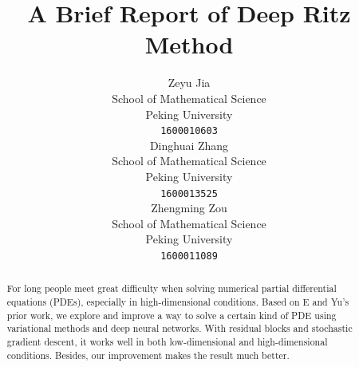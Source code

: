 \documentclass{article}
\title{A Brief Report of Deep Ritz Method}
\author{
  Zeyu Jia\\School of Mathematical Science\\Peking University\\ \texttt{1600010603} \\
  \And
  Dinghuai Zhang\\School of Mathematical Science\\Peking University\\ \texttt{1600013525}\\
  \And
  Zhengming Zou\\School of Mathematical Science\\Peking University \\ \texttt{1600011089}
}
\begin{document}

\maketitle

\begin{abstract}
For long people meet great difficulty when solving numerical partial differential equations (PDEs), especially in high-dimensional conditions. Based on E and Yu's prior work, we explore and improve a way to solve a certain kind of PDE using variational methods and deep neural networks. With residual blocks and stochastic gradient descent, it works well in both low-dimensional and high-dimensional conditions. Besides, our improvement makes the result much better.
\end{abstract}
\end{document}
